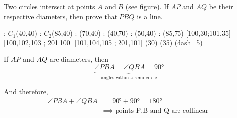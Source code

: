 

\question[2] Two circles intersect at points $A$ and $B$ (see figure). If $AP$ and $AQ$ be their 
respective diameters, then prove that $PBQ$ is a line.

  : $C_1$(40,40)
  : $C_2$(85,40)
  : (70,40) %
  : (40,70) %
  : (50,40) %
  : (85,75)
   [100,30;101,35] %
   [100,102,103 ; 201,100] %
   [101,104,105 ; 201,101] %
\figdrawbegin{}
  (30)
  (35)
  \figdrawline [201,301]
  \figdrawline [201,311]
  \figdrawline [301,311]
  \ifprintanswers
    \figset (dash=5)
    \figdrawline [201,200]
  \fi
\figdrawend
{}

\vspace{1cm}
\centerline{\box\figBoxA}

\begin{solution}[\halfpage]
	If $AP$ and $AQ$ are diameters, then 
  \[ \underbrace{\angle{PBA}=\angle{QBA}=\ang{90}}_{\text{angles within a semi-circle}} \]
	
	And therefore, 
	\begin{align}
		\angle PBA + \angle QBA &= \ang{90} + \ang{90} = \ang{180} \\
		     &\implies \text{ points P,B and Q are collinear }
	\end{align}
\end{solution}

